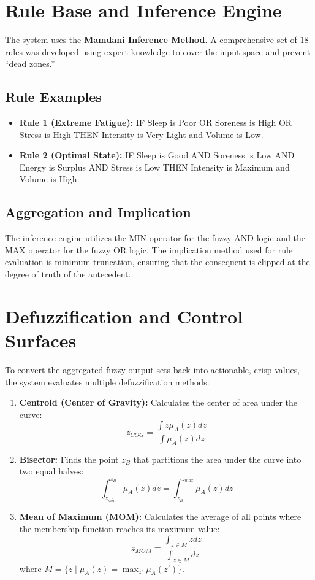 \documentclass[conference]{IEEEtran}
\begin{document}
\section{Rule Base and Inference Engine}
The system uses the \textbf{Mamdani Inference Method}. A comprehensive set of 18 rules was developed using expert knowledge to cover the input space and prevent ``dead zones.''

\subsection{Rule Examples}
\begin{itemize}
    \item \textbf{Rule 1 (Extreme Fatigue):} IF Sleep is Poor OR Soreness is High OR Stress is High THEN Intensity is Very Light and Volume is Low.
    \item \textbf{Rule 2 (Optimal State):} IF Sleep is Good AND Soreness is Low AND Energy is Surplus AND Stress is Low THEN Intensity is Maximum and Volume is High.
\end{itemize}

\subsection{Aggregation and Implication}
The inference engine utilizes the MIN operator for the fuzzy AND logic and the MAX operator for the fuzzy OR logic. The implication method used for rule evaluation is minimum truncation, ensuring that the consequent is clipped at the degree of truth of the antecedent.

\section{Defuzzification and Control Surfaces}
To convert the aggregated fuzzy output sets back into actionable, crisp values, the system evaluates multiple defuzzification methods:
\begin{enumerate}
    \item \textbf{Centroid (Center of Gravity):} Calculates the center of area under the curve:
    \begin{equation}
    z_{COG} = \frac{\int z \mu_A(z) dz}{\int \mu_A(z) dz}
    \end{equation}
    \item \textbf{Bisector:} Finds the point $z_B$ that partitions the area under the curve into two equal halves:
    \begin{equation}
    \int_{z_{min}}^{z_B} \mu_A(z) dz = \int_{z_B}^{z_{max}} \mu_A(z) dz
    \end{equation}
    \item \textbf{Mean of Maximum (MOM):} Calculates the average of all points where the membership function reaches its maximum value:
    \begin{equation}
    z_{MOM} = \frac{\int_{z \in M} z dz}{\int_{z \in M} dz}
    \end{equation}
    where $M = \{z \mid \mu_A(z) = \max_{z'} \mu_A(z')\}$.
\end{enumerate}
\end{document}
